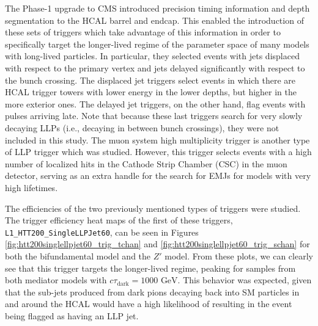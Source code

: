 The Phase-1 upgrade to CMS introduced precision timing information and depth segmentation to the HCAL barrel and endcap. This enabled the introduction of these sets of triggers which take advantage of this information in order to specifically target the longer-lived regime of the parameter space of many models with long-lived particles. In particular, they selected events with jets displaced with respect to the primary vertex and jets delayed significantly with respect to the bunch crossing. The displaced jet triggers select events in which there are HCAL trigger towers with lower energy in the lower depths, but higher in the more exterior ones. The delayed jet triggers, on the other hand, flag events with pulses arriving late. Note that because these last triggers search for very slowly decaying LLPs (i.e., decaying in between bunch crossings), they were not included in this study. The muon system high multiplicity trigger is another type of LLP trigger which was studied. However, this trigger selects events with a high number of localized hits in the Cathode Strip Chamber (CSC) in the muon detector, serving as an extra handle for the search for EMJs for models with very high lifetimes.

The efficiencies of the two previously mentioned types of triggers were studied. The trigger efficiency heat maps of the first of these triggers, \texttt{L1\_HTT200\_SingleLLPJet60}, can be seen in Figures \ref{fig:htt200singlellpjet60_trig_tchan} and \ref{fig:htt200singlellpjet60_trig_schan} for both the bifundamental model and the $Z'$ model. From these plots, we can clearly see that this trigger targets the longer-lived regime, peaking for samples from both mediator models with $c\tau_{\text{dark}} = 1000 \text{ GeV}$. This behavior was expected, given that the sub-jets produced from dark pions decaying back into SM particles in and around the HCAL would have a high likelihood of resulting in the event being flagged as having an LLP jet. 

